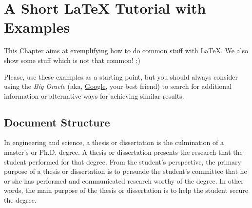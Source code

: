 % 
%  
%
\chapter{A Short \LaTeX{} Tutorial with Examples}
\label{cha:a_short_latex_tutorial_with_examples}

This Chapter aims at exemplifying how to do common stuff with \LaTeX. We also show some stuff which is not that common! ;) 

Please, use these examples as a starting point, but you should always consider using the \emph{Big Oracle} (aka, \href{http://www.google.com}{Google}, your best friend) to search for additional information or alternative ways for achieving similar results.

\bigskip
\noindent%
\bigskip

\section{Document Structure} %
\label{sec:document_structure}

In engineering and science, a thesis or dissertation is the culmination of a master's or Ph.D. degree. A thesis or dissertation presents the research that the student performed for that degree. From the student's perspective, the primary purpose of a thesis or dissertation is to persuade the student's committee that he or she has performed and communicated research worthy of the degree. In other words, the main purpose of the thesis or dissertation is to help the student secure the degree. 


